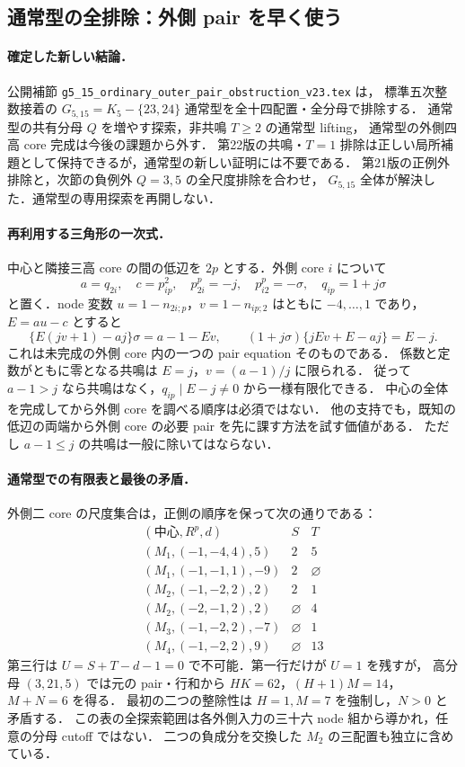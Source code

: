 \subsection{通常型の全排除：外側 pair を早く使う}
\label{notes:g51523-ordinary}

\paragraph{確定した新しい結論．}
公開補節 \nolinkurl{g5_15_ordinary_outer_pair_obstruction_v23.tex} は，
標準五次整数接着の $G_{5,15}=K_5-\{23,24\}$ 通常型を全十四配置・全分母で排除する．
通常型の共有分母 $Q$ を増やす探索，非共鳴 $T\ge2$ の通常型 lifting，
通常型の外側四高 core 完成は今後の課題から外す．
第22版の共鳴・$T=1$ 排除は正しい局所補題として保持できるが，通常型の新しい証明には不要である．
第21版の正例外排除と，次節の負例外 $Q=3,5$ の全尺度排除を合わせ，
$G_{5,15}$ 全体が解決した．通常型の専用探索を再開しない．

\paragraph{再利用する三角形の一次式．}
中心と隣接三高 core の間の低辺を $2p$ とする．外側 core $i$ について
\[
 a=q_{2i},\quad c=p^2_{ip},\quad
 p^p_{2i}=-j,\quad p^p_{i2}=-\sigma,\quad q_{ip}=1+j\sigma
\]
と置く．node 変数 $u=1-n_{2i;p}$，$v=1-n_{ip;2}$ はともに $-4,\ldots,1$ であり，
$E=au-c$ とすると
\[
 \{E(jv+1)-aj\}\sigma=a-1-Ev,
 \qquad
 (1+j\sigma)\{jEv+E-aj\}=E-j.
\]
これは未完成の外側 core 内の一つの pair equation そのものである．
係数と定数がともに零となる共鳴は $E=j$，$v=(a-1)/j$ に限られる．
従って $a-1>j$ なら共鳴はなく，$q_{ip}\mid E-j\ne0$ から一様有限化できる．
中心の全体を完成してから外側 core を調べる順序は必須ではない．
他の支持でも，既知の低辺の両端から外側 core の必要 pair を先に課す方法を試す価値がある．
ただし $a-1\le j$ の共鳴は一般に除いてはならない．

\paragraph{通常型での有限表と最後の矛盾．}
外側二 core の尺度集合は，正側の順序を保って次の通りである：
\[
\begin{array}{c|c|c}
 (\text{中心},R^p,d)&S&T\\\hline
 (M_1,(-1,-4,4),5)&2&5\\
 (M_1,(-1,-1,1),-9)&2&\varnothing\\
 (M_2,(-1,-2,2),2)&2&1\\
 (M_2,(-2,-1,2),2)&\varnothing&4\\
 (M_3,(-1,-2,2),-7)&\varnothing&1\\
 (M_4,(-1,-2,2),9)&\varnothing&13
\end{array}
\]
第三行は $U=S+T-d-1=0$ で不可能．第一行だけが $U=1$ を残すが，
高分母 $(3,21,5)$ では元の pair・行和から
$HK=62$，$(H+1)M=14$，$M+N=6$ を得る．
最初の二つの整除性は $H=1,M=7$ を強制し，$N>0$ と矛盾する．
この表の全探索範囲は各外側入力の三十六 node 組から導かれ，任意の分母 cutoff ではない．
二つの負成分を交換した $M_2$ の三配置も独立に含めている．

